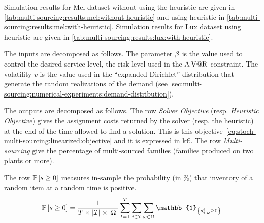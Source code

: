 

Simulation results for Mel dataset without using the heuristic are given in \cref{tab:multi-sourcing:results:mel:without-heuristic} and using heuristic in \cref{tab:multi-sourcing:results:mel:with-heuristic}.
Simulation results for Lux dataset using heuristic are given in \cref{tab:multi-sourcing:results:lux:with-heuristic}.


The inputs are decomposed as follows.
The parameter $\beta$ is the value used to control the desired service level, \ie the risk level used in the $\operatorname{A\operatorname{V@R}}$ constraint.
The volatility $v$ is the value used in the ``expanded Dirichlet'' distribution that generate the random realizations of the demand (see \cref{sec:multi-sourcing:numerical-experiments:demand-distribution}).


The outputs are decomposed as follows.
The row \emph{Solver Objective} (resp. \emph{Heuristic Objective}) gives the assignment costs returned by the solver (resp. the heuristic) at the end of the time allowed to find a solution.
This is this objective~\eqref{eq:stoch-multi-sourcing:linearized:objective} and it is expressed in k\euro{}.
The row \emph{Multi-sourcing} give the percentage of multi-sourced families (\ie families produced on two plants or more).


The row $\prob\sqbracket{s\ge0}$ measures in-sample the probability (in \%) that inventory of a random item at a random time is positive.
\begin{equation}
  \prob\sqbracket{s\ge0}=\frac{1}{\horizon\times\card{\REF}\times\card{\scenarios}}\sum_{t=1}^{\horizon}\sum_{i\in\REF}\sum_{\omega\in\scenarios} \mathbb{1}_{\crbracket{\inventory_{t,\omega}^i\ge0}}
\end{equation}


